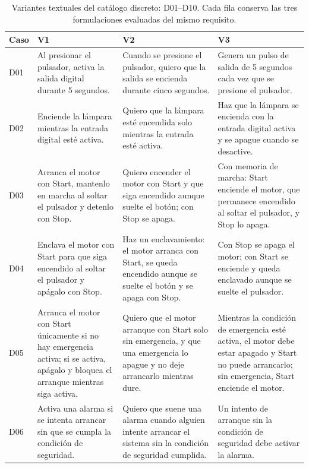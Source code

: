 \documentclass[a4paper,fleqn]{cas-dc}
\begin{document}
\onecolumn
\begin{table}[!ht]
\centering
\footnotesize
\setlength{\tabcolsep}{4pt}
\renewcommand{\arraystretch}{1.10}
\caption{Variantes textuales del catálogo discreto: D01--D10. Cada fila conserva las tres formulaciones evaluadas del mismo requisito.}
\label{tab:variantes_textuales}
\begin{tabularx}{\textwidth}{@{}l >{\raggedright\arraybackslash}X >{\raggedright\arraybackslash}X >{\raggedright\arraybackslash}X@{}}
\toprule Caso & V1 & V2 & V3\\ \midrule
D01 & Al presionar el pulsador, activa la salida digital durante 5 segundos. & Cuando se presione el pulsador, quiero que la salida se encienda durante cinco segundos. & Genera un pulso de salida de 5 segundos cada vez que se presione el pulsador.\\
\addlinespace[2pt]
D02 & Enciende la lámpara mientras la entrada digital esté activa. & Quiero que la lámpara esté encendida solo mientras la entrada esté activa. & Haz que la lámpara se encienda con la entrada digital activa y se apague cuando se desactive.\\
\addlinespace[2pt]
D03 & Arranca el motor con Start, mantenlo en marcha al soltar el pulsador y detenlo con Stop. & Quiero encender el motor con Start y que siga encendido aunque suelte el botón; con Stop se apaga. & Con memoria de marcha: Start enciende el motor, que permanece encendido al soltar el pulsador, y Stop lo apaga.\\
\addlinespace[2pt]
D04 & Enclava el motor con Start para que siga encendido al soltar el pulsador y apágalo con Stop. & Haz un enclavamiento: el motor arranca con Start, se queda encendido aunque se suelte el botón y se apaga con Stop. & Con Stop se apaga el motor; con Start se enciende y queda enclavado aunque se suelte el pulsador.\\
\addlinespace[2pt]
D05 & Arranca el motor con Start únicamente si no hay emergencia activa; si se activa, apágalo y bloquea el arranque mientras siga activa. & Quiero que el motor arranque con Start solo sin emergencia, y que una emergencia lo apague y no deje arrancarlo mientras dure. & Mientras la condición de emergencia esté activa, el motor debe estar apagado y Start no puede arrancarlo; sin emergencia, Start enciende el motor.\\
\addlinespace[2pt]
D06 & Activa una alarma si se intenta arrancar sin que se cumpla la condición de seguridad. & Quiero que suene una alarma cuando alguien intente arrancar el sistema sin la condición de seguridad cumplida. & Un intento de arranque sin la condición de seguridad debe activar la alarma.\\

\end{tabularx}
\end{table}
\end{document}
